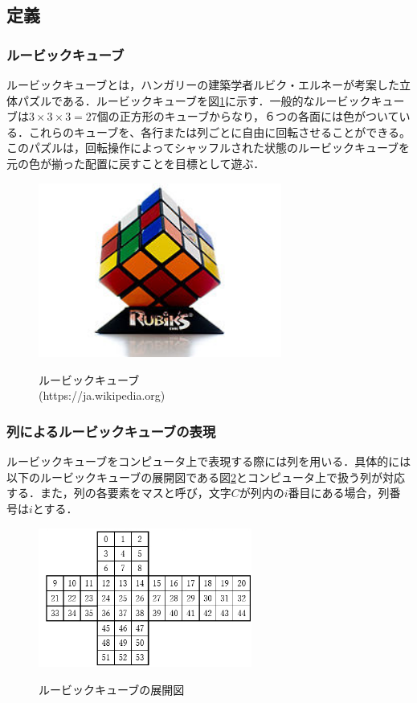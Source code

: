 \documentclass[a4j,titlepage]{jsarticle}
\begin{document}
\subsection{定義}
\subsubsection{ルービックキューブ}
ルービックキューブとは，ハンガリーの建築学者ルビク・エルネーが考案した立体パズルである．ルービックキューブを図\ref{fig:rubik-cube}に示す．一般的なルービックキューブは\(3\times 3\times 3=27\)個の正方形のキューブからなり，６つの各面には色がついている．これらのキューブを、各行または列ごとに自由に回転させることができる。このパズルは，回転操作によってシャッフルされた状態のルービックキューブを元の色が揃った配置に戻すことを目標として遊ぶ．

\begin{figure}
  \centering
  \includegraphics[width=8cm]{./tex_pic/rubik-cube.jpg}\\
  \caption{ルービックキューブ\\(https://ja.wikipedia.org)}
  \label{fig:rubik-cube}
\end{figure}

\subsubsection{列によるルービックキューブの表現}
ルービックキューブをコンピュータ上で表現する際には列を用いる．具体的には以下のルービックキューブの展開図である図\ref{fig:rubik-cube-Dev}とコンピュータ上で扱う列が対応する．また，列の各要素をマスと呼び，文字\(C\)が列内の\(i\)番目にある場合，列番号は\(i\)とする．

\begin{figure}
\centering
  \includegraphics[width=7cm]{./tex_pic/seq.jpg}\\
  \caption{ルービックキューブの展開図}
  \label{fig:rubik-cube-Dev}
\end{figure}
\end{document}
